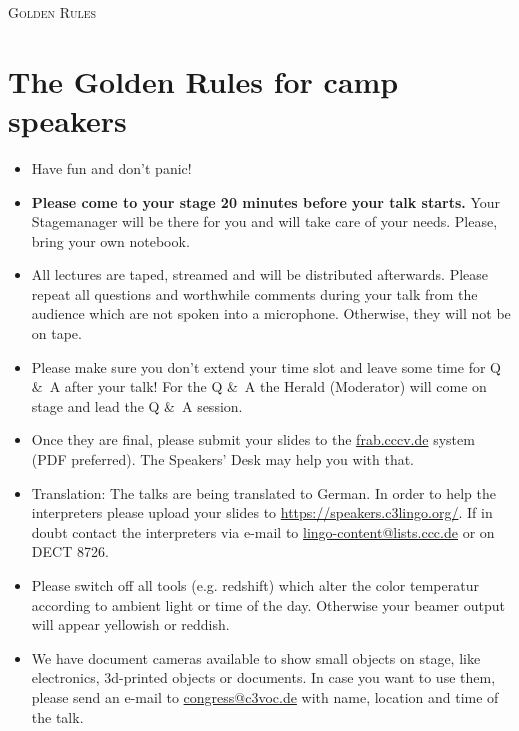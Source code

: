 \documentclass[paper=a4]{scrartcl}
\begin{document}
	\begin{center} \textsc{\Huge Golden Rules}\end{center}
	\hfill
	\section*{The Golden Rules for camp speakers}
	\begin{itemize}
		\item Have fun and don't panic!
		\item \textbf{Please come to your stage 20 minutes before your talk starts.} Your
		Stagemanager will be there	for	you and will take care of your needs. Please, bring your own notebook.
		\item All lectures are taped, streamed and will be distributed afterwards. Please repeat all questions and worthwhile comments during your talk from the audience which are not spoken into a microphone. Otherwise, they will not be on tape.
		\item Please make sure you don't extend your time slot and
		leave some time for Q \&\ A after your talk! For the Q \&\ A  the Herald (Moderator) will come on stage and lead the Q \&\ A session. 
		\item Once they are final, please submit your slides to the \url{frab.cccv.de} system (PDF preferred). The Speakers' Desk may help you with that.
		\item Translation: The talks are being translated to German. In order to help the interpreters please upload your slides to \url{https://speakers.c3lingo.org/}. If in doubt contact the interpreters via e-mail  to \url{lingo-content@lists.ccc.de} or on DECT 8726.
		\item Please switch off all tools (e.g. redshift) which alter the color temperatur according to ambient light or time of the day. Otherwise your beamer output will appear yellowish or reddish.
		\item We have document cameras available to show small objects on stage, like electronics, 3d-printed objects or documents. In case you want to use them, please send an e-mail to \url{congress@c3voc.de} with name, location and time of the talk.
	\end{itemize}
\end{document}
